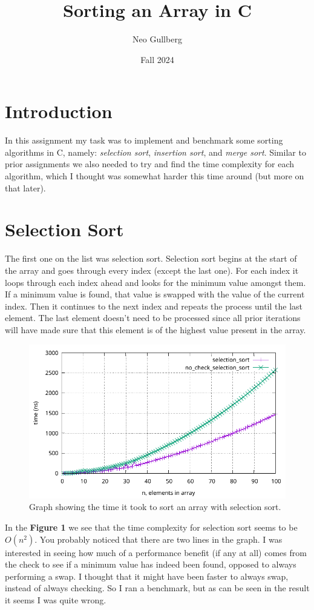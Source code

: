 \documentclass[a4paper, 11pt]{article}
\begin{document}
\title{
	\textbf{Sorting an Array in C}
}
\author{Neo Gullberg}
\date{Fall 2024}
\maketitle

\section{Introduction}
	In this assignment my task was to implement and benchmark some sorting algorithms in C, namely:
	\textit{selection sort}, \textit{insertion sort}, and \textit{merge sort}.
	Similar to prior assignments we also needed to try and find the time complexity for each algorithm,
	which I thought was somewhat harder this time around (but more on that later).

\section{Selection Sort}
	The first one on the list was selection sort.
	Selection sort begins at the start of the array and goes through every index (except the last one).
	For each index it loops through each index ahead and looks for the minimum value amongst them.
	If a minimum value is found, that value is swapped with the value of the current index.
	Then it continues to the next index and repeats the process until the last element.
	The last element doesn't need to be processed since all prior iterations will have made sure that this element is of the highest value present in the array.
	\begin{figure}[H]
		\centering
		\includegraphics[scale=0.7]{graphs/selection_sort_vs_no_check_selection_sort.pdf}
		\caption{
			Graph showing the time it took to sort an array with selection sort.
		}
	\end{figure}
	In the \textbf{Figure 1} we see that the time complexity for selection sort seems to be \(O(n^2)\).
	You probably noticed that there are two lines in the graph.
	I was interested in seeing how much of a performance benefit (if any at all) comes from the check to see if a minimum value has indeed been found,
	opposed to always performing a swap.
	I thought that it might have been faster to always swap, instead of always checking.
	So I ran a benchmark, but as can be seen in the result it seems I was quite wrong.
\end{document}
